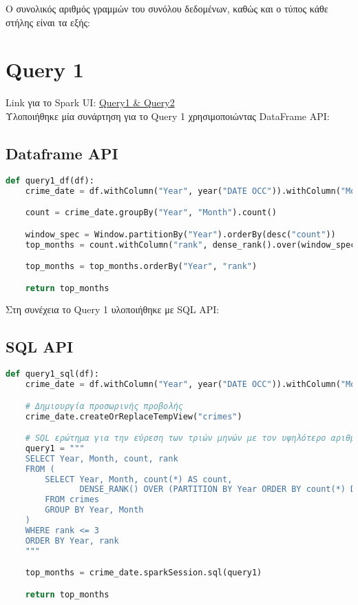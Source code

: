 \documentclass{article}
\begin{document}
\vspace{1\baselineskip}

Ο συνολικός αριθμός γραμμών του συνόλου δεδομένων, καθώς και ο τύπος κάθε στήλης είναι τα εξής:


\section{Query 1}

Link για το Spark UI:
\href{http://83.212.81.191:18080/history/application_1705357398960_0013/jobs/}{Query1 \& Query2} \\

Υλοποιήθηκε μία συνάρτηση για το Query 1 χρησιμοποιώντας DataFrame API: 
\subsection*{Dataframe API}

\begin{lstlisting}[language = Python]
    def query1_df(df):
    crime_date = df.withColumn("Year", year("DATE OCC")).withColumn("Month", month("DATE OCC"))

    count = crime_date.groupBy("Year", "Month").count()

    window_spec = Window.partitionBy("Year").orderBy(desc("count"))
    top_months = count.withColumn("rank", dense_rank().over(window_spec)).filter(col("rank") <= 3)

    top_months = top_months.orderBy("Year", "rank")

    return top_months
\end{lstlisting}  

Στη συνέχεια το Query 1 υλοποιήθηκε με SQL API:
\subsection*{SQL API}

\begin{lstlisting}[language = Python]
    def query1_sql(df):
    crime_date = df.withColumn("Year", year("DATE OCC")).withColumn("Month", month("DATE OCC"))

    # Δημιουργία προσωρινής προβολής
    crime_date.createOrReplaceTempView("crimes")

    # SQL ερώτημα για την εύρεση των τριών μηνών με τον υψηλότερο αριθμό εγκλημάτων ανά έτος
    query1 = """
    SELECT Year, Month, count, rank 
    FROM (
        SELECT Year, Month, count(*) AS count, 
               DENSE_RANK() OVER (PARTITION BY Year ORDER BY count(*) DESC) AS rank
        FROM crimes
        GROUP BY Year, Month
    ) 
    WHERE rank <= 3
    ORDER BY Year, rank
    """

    top_months = crime_date.sparkSession.sql(query1)

    return top_months

\end{lstlisting}  
\end{document}
